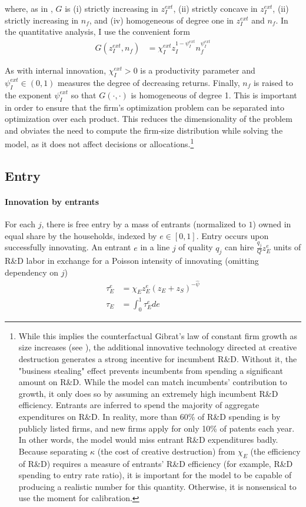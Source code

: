\documentclass[11pt,english]{article}
\theoremstyle{remark}
\begin{document}
where, as in \cite{klette_innovating_2004}, $G$ is (i) strictly increasing in $z_I^{ext}$, (ii) strictly concave in $z_I^{ext}$, (ii) strictly increasing in $n_f$, and (iv) homogeneous of degree one in $z_I^{ext}$ and $n_f$. In the quantitative analysis, I use the convenient form
\begin{align}
	G(z_I^{ext},n_f) &= \chi_I^{ext} z_I^{1-\psi_I^{ext}} n_f^{\psi_I^{ext}} 
\end{align}

As with internal innovation, $\chi_I^{ext} > 0$ is a productivity parameter and $\psi_I^{ext} \in (0,1)$ measures the degree of decreasing returns. Finally, $n_f$ is raised to the exponent $\psi_I^{ext}$ so that $G(\cdot,\cdot)$ is homogeneous of degree 1. This is important in order to ensure that the firm's optimization problem can be separated into optimization over each product. This reduces the dimensionality of the problem and obviates the need to compute the firm-size distribution while solving the model, as it does not affect decisions or allocations.\footnote{While this implies the counterfactual Gibrat's law of constant firm growth as size increases (see \cite{akcigit_growth_2018}), the additional innovative technology directed at creative destruction generates a strong incentive for incumbent R\&D. Without it, the "business stealing" effect prevents incumbents from spending a significant amount on R\&D. While the model can match incumbents' contribution to growth, it only does so by assuming an extremely high incumbent R\&D efficiency. Entrants are inferred to spend the majority of aggregate expenditures on R\&D. In reality, more than 60\% of R\&D spending is by publicly listed firms, and new firms apply for only 10\% of patents each year. In other words, the model would miss entrant R\&D expenditures badly. Because separating $\kappa$ (the cost of creative destruction) from $\chi_E$ (the efficiency of R\&D) requires a measure of entrants' R\&D efficiency (for example, R\&D spending to entry rate ratio), it is important for the model to be capable of producing a realistic number for this quantity. Otherwise, it is nonsensical to use the moment for calibration.}

\subsection{Entry} 

\paragraph{Innovation by entrants} For each $j$, there is free entry by a mass of entrants (normalized to $1$) owned in equal share by the households, indexed by $e \in [0,1]$. Entry occurs upon successfully innovating. An entrant $e$ in a line $j$ of quality $q_j$ can hire $\frac{q_j}{Q} z_E^e$ units of R\&D labor in exchange for a Poisson intensity of innovating (omitting dependency on $j$)
\begin{align}
\tau_E^e &= \chi_E z_E^e (z_E + z_S)^{-\hat{\psi}} \label{simplified_entrant_innovation_rate} \\
\tau_E &= \int_0^1 \tau_E^e de \nonumber
\end{align}
\end{document}
